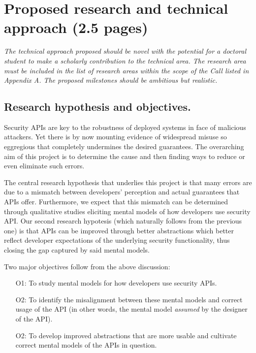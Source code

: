 \documentclass[10pt]{article}
\begin{document}

\section{Proposed research and technical approach (2.5 pages)}

\emph{The technical approach proposed should be novel with the potential for a doctoral student to make a scholarly contribution to the technical area. The research area must be included in the list of research areas within the scope of the Call listed in Appendix A. The proposed milestones should be ambitious but realistic.}




%

\subsection*{Research hypothesis and objectives.}

Security APIs are key to the robustness of deployed systems in face of malicious attackers. 
Yet there is by now mounting evidence of widespread misuse so eggregious that  completely undermines the desired guarantees.  The overarching aim of this project is to determine the cause and then finding ways to reduce or even eliminate such errors. 

The central research hypothesis that underlies this project is that many errors are due to a mismatch between developers' perception and actual guarantees that APIs offer. Furthermore, we expect that this mismatch can be determined through qualitative studies eliciting mental models of how developers use security API.
Our second research hypotesis (which naturally follows from the previous one) is that APIs can be improved through better abstractions which better reflect developer expectations of the underlying security functionality, thus closing the gap captured by said mental models.  

Two major objectives follow from the above discussion: 
\begin{itemize}
\item[O1:] To study mental models for how developers use security APIs.

\item[O2:] To identify the misalignment between these mental models and correct usage of the API (in other words, the mental model \textit{assumed} by the designer of the API).

\item[O2:] To develop improved abstractions that are more usable and cultivate correct mental models of the APIs in question.
\end{itemize}
\end{document}
